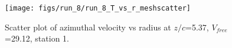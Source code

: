 \begin{figure}[H]
\centering
\texttt{[image: figs/run\_8/run\_8\_T\_vs\_r\_meshscatter]}
\caption{Scatter plot of azimuthal velocity vs radius at $z/c$=5.37, $V_{free}$=29.12, station 1.}
\label{fig:run_8_T_vs_r_meshscatter}
\end{figure}


